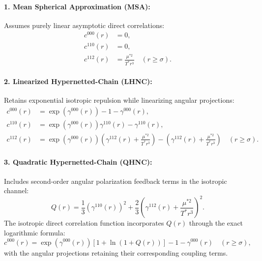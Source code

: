 \documentclass[11pt,a4paper]{article}
\begin{document}
\paragraph{1. Mean Spherical Approximation (MSA):}
Assumes purely linear asymptotic direct correlations:
\begin{align}
    c^{000}(r) &= 0, \\
    c^{110}(r) &= 0, \\
    c^{112}(r) &= \frac{\mu^{*2}}{T^* r^3} \quad (r \ge \sigma).
\end{align}

\paragraph{2. Linearized Hypernetted-Chain (LHNC):}
Retains exponential isotropic repulsion while linearizing angular projections:
\begin{align}
    c^{000}(r) &= \exp\left(\gamma^{000}(r)\right) - 1 - \gamma^{000}(r), \\
    c^{110}(r) &= \exp\left(\gamma^{000}(r)\right)\gamma^{110}(r) - \gamma^{110}(r), \\
    c^{112}(r) &= \exp\left(\gamma^{000}(r)\right)\left(\gamma^{112}(r) + \frac{\mu^{*2}}{T^* r^3}\right) - \left(\gamma^{112}(r) + \frac{\mu^{*2}}{T^* r^3}\right) \quad (r \ge \sigma).
\end{align}

\paragraph{3. Quadratic Hypernetted-Chain (QHNC):}
Includes second-order angular polarization feedback terms in the isotropic channel:
\begin{equation}
    Q(r) = \frac{1}{3}\left(\gamma^{110}(r)\right)^2 + \frac{2}{3}\left(\gamma^{112}(r) + \frac{\mu^{*2}}{T^* r^3}\right)^2.
\end{equation}
The isotropic direct correlation function incorporates $Q(r)$ through the exact logarithmic formula:
\begin{equation}
    c^{000}(r) = \exp\left(\gamma^{000}(r)\right) \left[ 1 + \ln\left(1 + Q(r)\right) \right] - 1 - \gamma^{000}(r) \quad (r \ge \sigma),
\end{equation}
with the angular projections retaining their corresponding coupling terms.
\end{document}
